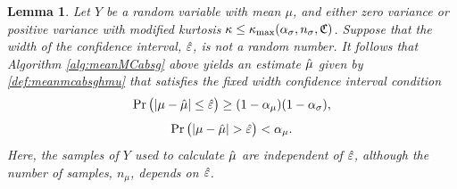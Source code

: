 \documentclass{iitthesis}
\newtheorem{lemma}[theorem]{Lemma}
\theoremstyle{definition}
\begin{document}
\begin{lemma}\label{thm:fixedwidthrandomeps}
Let $Y$ be a random variable with mean $\mu$, and either zero variance or positive variance with modified kurtosis $\kappa \leq \kappa_{\max}(\alpha_\sigma, n_\sigma, \mathfrak{C})$. Suppose that the width of the confidence interval, $\hat{\varepsilon}$, is not a random number. It follows that Algorithm \ref{alg:meanMCabsg} above yields an estimate $\hat{\mu}$ given by \eqref{def:meanmcabsghmu} that satisfies the fixed width confidence interval condition
\begin{align}\label{eq:fixedwidthrandomeps}
\Pr\left( \left \lvert \mu-\hat{\mu} \right \rvert \leq \hat{\varepsilon} \right) \geq (1-\alpha_\mu)(1-\alpha_\sigma),
\end{align}
\begin{align}
\Pr\left( \left \lvert \mu-\hat{\mu} \right \rvert > \hat{\varepsilon} \right) <\alpha_\mu.
\end{align}
Here, the samples of $Y$ used to calculate $\hat{\mu}$ are independent of $\hat{\varepsilon}$, although the number of samples, $n_\mu$, depends on $\hat{\varepsilon}$.
\end{lemma}
\end{document}
